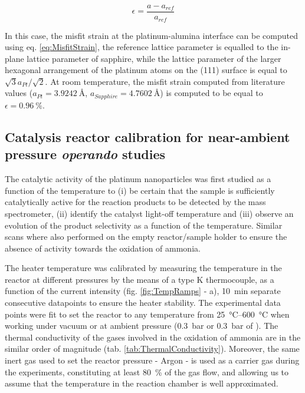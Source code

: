 \begin{equation}
    \epsilon = \frac{a - a_{ref}}{a_{ref}}
    \label{eq:StrainDiffraction}
\end{equation}

In this case, the misfit strain at the platinum-alumina interface can be computed using eq. \ref{eq:MisfitStrain}, the reference lattice parameter is equalled to the in-plane lattice parameter of sapphire, while the lattice parameter of the larger hexagonal arrangement of the platinum atoms on the (111) surface is equal to $\sqrt{3} a_{Pt} / \sqrt{2} $.
At room temperature, the misfit strain computed from literature values ($a_{Pt} = \qty{3.9242}{\angstrom}$, $a_{Sapphire} = \qty{4.7602}{\angstrom}$) is computed to be equal to $\epsilon = \qty{0.96}{\percent}$.

\subsection{Catalysis reactor calibration for near-ambient pressure \textit{operando} studies}

The catalytic activity of the platinum nanoparticles was first studied as a function of the temperature to (i) be certain that the sample is sufficiently catalytically active for the reaction products to be detected by the mass spectrometer, (ii) identify the catalyst light-off temperature and (iii) observe an evolution of the product selectivity as a function of the temperature.
Similar scans where also performed on the empty reactor/sample holder to ensure the absence of activity towards the oxidation of ammonia.

The heater temperature was calibrated by measuring the temperature in the reactor at different pressures by the means of a type K thermocouple, as a function of the current intensity (fig. \ref{fig:TempRamps} - a), \qty{10}{\minute} separate consecutive datapoints to ensure the heater stability.
The experimental data points were fit to set the reactor to any temperature from \qtyrange{25}{600}{\degreeCelsius} when working under vacuum or at ambient pressure (\qty{0.3}{\bar} or \qty{0.3}{\bar} of ).
The thermal conductivity of the gases involved in the oxidation of ammonia are in the similar order of magnitude (tab. \ref{tab:ThermalConductivity}).
Moreover, the same inert gas used to set the reactor pressure - Argon - is used as a carrier gas during the experiments, constituting at least \qty{80}{\percent} of the gas flow, and allowing us to assume that the temperature in the reaction chamber is well approximated.

